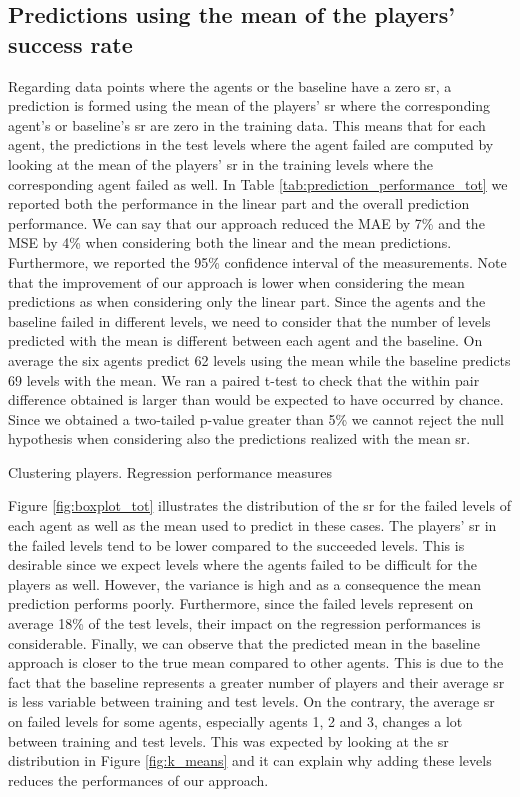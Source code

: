 \subsection*{Predictions using the mean of the players’ success rate}
Regarding data points where the agents or the baseline have a zero \acs{sr}, a prediction is formed using the mean of the players' \acs{sr} where the corresponding agent's or baseline's \acs{sr} are zero in the training data. This means that for each agent, the predictions in the test levels where the agent failed are computed by looking at the mean of the players' \acs{sr} in the training levels where the corresponding agent failed as well. In Table \ref{tab:prediction_performance_tot} we reported both the performance in the linear part and the overall prediction performance. We can say that our approach reduced the MAE by 7\% and the MSE by 4\% when considering both the linear and the mean predictions. Furthermore, we reported the 95\% confidence interval of the measurements. Note that the improvement of our approach is lower when considering the mean predictions as when considering only the linear part.
Since the agents and the baseline failed in different levels, we need to consider that the number of levels predicted with the mean is different between each agent and the baseline. On average the six agents predict 62 levels using the mean while the baseline predicts 69 levels with the mean.
We ran a paired t-test to check that the within pair difference obtained is larger than would be expected to have occurred by chance. Since we obtained a two-tailed p-value greater than 5\% we cannot reject the null hypothesis when considering also the predictions realized with the mean \acs{sr}.
\begin{table}[h]
    \centering
    \small
    \caption{Clustering players. Regression performance measures} 
    
    \label{tab:prediction_performance_tot}
\end{table} 

Figure \ref{fig:boxplot_tot} illustrates the distribution of the \acs{sr} for the failed levels of each agent as well as the mean used to predict in these cases. The players' \acs{sr} in the failed levels tend to be lower compared to the succeeded levels. This is desirable since we expect levels where the agents failed to be difficult for the players as well. However, the variance is high and as a consequence the mean prediction performs poorly. Furthermore, since the failed levels represent on average 18\% of the test levels, their impact on the regression performances is considerable. Finally, we can observe that the predicted mean in the baseline approach is closer to the true mean compared to other agents. This is due to the fact that the baseline represents a greater number of players and their average \acs{sr} is less variable between training and test levels. On the contrary, the average \acs{sr} on failed levels for some agents, especially agents 1, 2 and 3, changes a lot between training and test levels. This was expected by looking at the \acs{sr} distribution in Figure \ref{fig:k_means} and it can explain why adding these levels reduces the performances of our approach.

